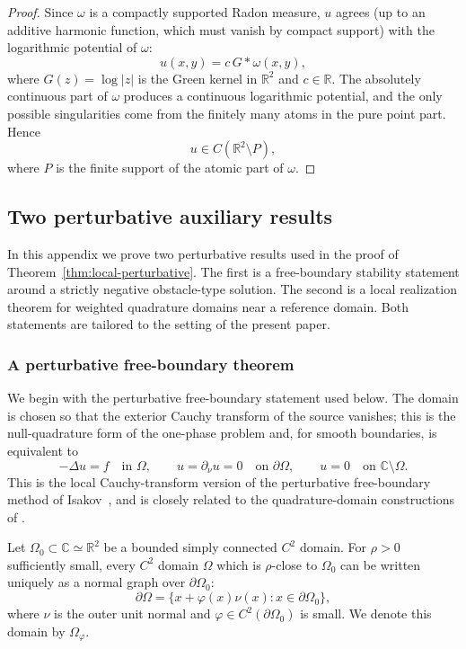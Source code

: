 \documentclass[a4paper,11pt,reqno]{amsart}
\numberwithin{equation}{section}
\theoremstyle{plain} %
\theoremstyle{definition} %
\theoremstyle{remark}
\newcommand{\R}{\mathbb{R}}
\newcommand{\C}{\mathbb{C}}
\begin{document}
\begin{proof}
Since $\omega$ is a compactly supported Radon measure, $u$ agrees (up to an additive harmonic function, which must vanish by compact support) with the logarithmic potential of $\omega$:
\[
u(x,y)=c\, G*\omega(x,y),
\]
where $G(z)=\log|z|$ is the Green kernel in $\R^2$ and $c\in\R$. The absolutely continuous part of $\omega$ produces a continuous logarithmic potential, and the only possible singularities come from the finitely many atoms in the pure point part. Hence
\[
u\in C(\R^2\setminus P),
\]
where $P$ is the finite support of the atomic part of $\omega$.
\end{proof}

\subsection{Two perturbative auxiliary results}\label{app:auxiliary-results}

In this appendix we prove two perturbative results used in the proof of
Theorem~\ref{thm:local-perturbative}. The first is a free-boundary stability
statement around a strictly negative obstacle-type solution. The second is a
local realization theorem for weighted quadrature domains near a reference
domain. Both statements are tailored to the setting of the present paper.

\subsubsection{A perturbative free-boundary theorem}\label{app:isakov-type}

We begin with the perturbative free-boundary statement used below. The domain
is chosen so that the exterior Cauchy transform of the source vanishes; this
is the null-quadrature form of the one-phase problem and, for smooth
boundaries, is equivalent to
\[
-\Delta u=f \quad\text{in }\Omega,\qquad
u=\partial_\nu u=0 \quad\text{on }\partial\Omega,\qquad
u=0 \quad\text{on }\C\setminus\Omega .
\]
This is the local Cauchy-transform version of the perturbative free-boundary
method of Isakov~\cite[Chapter~5]{Isakov}, and is closely related to the
quadrature-domain constructions of
\cite{Cherednichenko,Gustafsson,Gustafsson-Shahgholian,Shahgholian,Karp}.

Let \(\Omega_0\subset\C\simeq\R^2\) be a bounded simply connected \(C^2\)
domain. For \(\rho>0\) sufficiently small, every \(C^2\) domain \(\Omega\)
which is \(\rho\)-close to \(\Omega_0\) can be written uniquely as a normal
graph over \(\partial\Omega_0\):
\[
\partial\Omega=\{x+\varphi(x)\nu(x):x\in\partial\Omega_0\},
\]
where \(\nu\) is the outer unit normal and
\(\varphi\in C^2(\partial\Omega_0)\) is small. We denote this domain by
\(\Omega_\varphi\).
\end{document}
